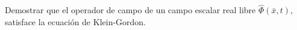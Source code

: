 Demostrar  que  el  operador  de  campo  de  un  campo  escalar  real  libre $\hat{\Phi}(\bar{x},t)$,  satisface  la  ecuación  de Klein-Gordon.

\begin{solution}\ \\

\end{solution}